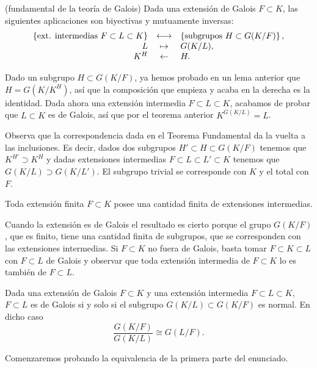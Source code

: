 \textrm{\normalfont (fundamental de la teoría de Galois)}
Dada una extensión de Galois \(F\subset K\), las siguientes aplicaciones
son biyectivas y mutuamente inversas:
\[\begin{array}{rcl}\left\{\text{ext. intermedias }F\subset L\subset K\right\}&\longleftrightarrow& \left\{\text{subgrupos }H\subset G(K/F)\right\},\cr L&\mapsto&G(K/L),\cr K^H&\leftarrow&H.\end{array}\]


Dado un subgrupo \(H\subset G(K/F)\), ya hemos probado en un lema
anterior que \(H=G(K/K^H)\), así que la composición que empieza y acaba
en la derecha es la identidad. Dada ahora una extensión intermedia
\(F\subset L\subset K\), acabamos de probar que \(L\subset K\) es de
Galois, así que por el teorema anterior \(K^{G(K/L)}=L\). 


Observa que la correspondencia dada en el Teorema Fundamental da la
vuelta a las inclusiones. Es decir, dados dos subgrupos
\(H'\subset H\subset G(K/F)\) tenemos que \(K^{H'}\supset K^H\) y dadas
extensiones intermedias \(F\subset L\subset L'\subset K\) tenemos que
\(G(K/L)\supset G(K/L')\). El subgrupo trivial se corresponde con \(K\)
y el total con \(F\). 


Toda extensión finita \(F\subset K\) posee una cantidad finita de
extensiones intermedias. 


Cuando la extensión es de Galois el resultado es cierto porque el grupo
\(G(K/F)\), que es finito, tiene una cantidad finita de subgrupos, que
se corresponden con las extensiones intermedias. Si \(F\subset K\) no
fuera de Galois, basta tomar \(F\subset K\subset L\) con \(F\subset L\)
de Galois y observar que toda extensión intermedia de \(F\subset K\) lo
es también de \(F\subset L\). 


Dada una extensión de Galois \(F\subset K\) y una extensión intermedia
\(F\subset L\subset K\), \(F\subset L\) es de Galois si y solo si el
subgrupo \(G(K/L)\subset G(K/F)\) es normal. En dicho caso
\[\frac{G(K/F)}{G(K/L)}\cong G(L/F).\] 


Comenzaremos probando la equivalencia de la primera parte del enunciado.

